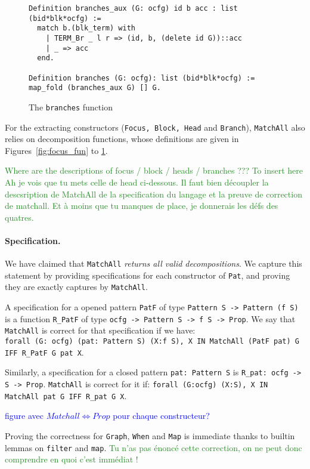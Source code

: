 \documentclass[11pt]{article}
\newcommand{\inlinecoq}[1]{\mbox{\lstinline[style=customcoq,columns=fixed,basewidth=.48em]{#1}}}
\newcommand{\ilc}[1]{\inlinecoq{#1}}
\newcommand{\leon}[1]{\textcolor{blue}{#1}}
\newcommand{\yz}[1]{\textcolor{ForestGreen}{#1}}
\newcommand{\yzt}[1]{\textcolor{ForestGreen!50}{#1}}
\newcommand{\pat}{\texttt{Pat}\xspace}
\begin{document}
\begin{figure}
  \begin{lstlisting}[style=customcoq,basicstyle=\small\ttfamily]
Definition branches_aux (G: ocfg) id b acc : list (bid*blk*ocfg) :=
  match b.(blk_term) with
    | TERM_Br _ l r => (id, b, (delete id G))::acc
    | _ => acc
  end.

Definition branches (G: ocfg): list (bid*blk*ocfg) := map_fold (branches_aux G) [] G.
  \end{lstlisting}
  \caption{The \ilc{branches} function}
  \label{fig:branches_fun}
\end{figure}

For the extracting constructors (\ilc{Focus, Block, Head} and \ilc{Branch}), \ilc{MatchAll} also relies on decomposition functions, whose definitions are given in Figures~\ref{fig:focus_fun} to \ref{fig:branches_fun}.

\yz{Where are the descriptions of focus / block / heads / branches ??? To insert here}
\yz{Ah je vois que tu mets celle de head ci-dessous. Il faut bien découpler la descsription de MatchAll de la specification du langage et la preuve de correction de matchall. Et à moins que tu manques de place, je donnerais les défs des quatres.}

\paragraph*{Specification.}
\yzt{We have claimed that \ilc{MatchAll} \emph{returns all valid decompositions}. We capture this statement by providing specifications for each constructor of \pat, and proving they are exactly captures by \ilc{MatchAll}.}

A specification for a opened pattern \ilc{PatF} of type \ilc{Pattern S -> Pattern (f S)} is a function \ilc{R_PatF} of type \ilc{ocfg -> Pattern S -> f S -> Prop}. We say that \ilc{MatchAll} is correct for that specification if we have:\\\ilc{forall (G: ocfg) (pat: Pattern S) (X:f S), X IN MatchAll (PatF pat) G IFF R_PatF G pat X}.

Similarly, a specification for a closed pattern \ilc{pat: Pattern S} is \ilc{R_pat: ocfg -> S -> Prop}. \ilc{MatchAll} is correct for it if: \ilc{forall (G:ocfg) (X:S), X IN MatchAll pat G IFF R_pat G X}. 

\leon{figure avec $Matchall \iff Prop$ pour chaque constructeur?}

Proving the correctness for \ilc{Graph}, \ilc{When} and \ilc{Map} is immediate thanks to builtin lemmas on \ilc{filter} and \ilc{map}. \yz{Tu n'as pas énoncé cette correction, on ne peut donc comprendre en quoi c'est immédiat !}
\end{document}
